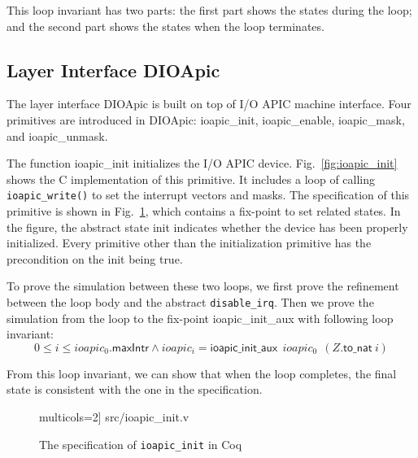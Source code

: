 This loop invariant has two parts: the first part shows the states during the
loop; and the second part shows the states when the loop terminates.

\subsection{Layer Interface DIOApic}

The layer interface DIOApic is built on top of I/O APIC machine interface. Four
primitives are introduced in DIOApic: \textsf{ioapic\_init},
\textsf{ioapic\_enable}, \textsf{ioapic\_mask}, and \textsf{ioapic\_unmask}.

The function \textsf{ioapic\_init} initializes the I/O APIC device.
Fig.~\ref{fig:ioapic_init} shows the C implementation of this primitive. It
includes a loop of calling \texttt{ioapic\_write()} to set the interrupt vectors
and masks. The specification of this primitive is shown in
Fig.~\ref{fig:ioapic_init_v}, which contains a fix-point to set related states.
In the figure, the abstract state \textsf{init} indicates whether the device has
been properly initialized. Every primitive other than the initialization
primitive has the precondition on the \textsf{init} being \textsf{true}.

To prove the simulation between these two loops, we first prove the refinement
between the loop body and the abstract \texttt{disable\_irq}. Then we prove the
simulation from the loop to the fix-point \textsf{ioapic\_init\_aux} with
following loop invariant:
\[
	0 \le i \le ioapic_{0}.\mathsf{maxIntr} \wedge
	ioapic_{i} = \mathsf{ioapic\_init\_aux} ~~ioapic_{0} ~~(Z.\textsf{to\_nat}~ i)
\]

\noindent{}From this loop invariant, we can show that when the loop
completes, the final state is consistent with the one in the specification.

\begin{figure}
	 multicols=2] {src/ioapic_init.v}
	\caption{The specification of \texttt{ioapic\_init} in Coq}
	\label{fig:ioapic_init_v}
\end{figure}


